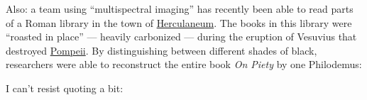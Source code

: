 \documentclass{article}
\def\tightlist{}
\renewcommand{\texttt}[1]{%
  \begingroup
  \ttfamily
  \begingroup\lccode`~=`/\lowercase{\endgroup\def~}{/\discretionary{}{}{}}%
  \begingroup\lccode`~=`[\lowercase{\endgroup\def~}{[\discretionary{}{}{}}%
  \begingroup\lccode`~=`.\lowercase{\endgroup\def~}{.\discretionary{}{}{}}%
  \catcode`/=\active\catcode`[=\active\catcode`.=\active
  \scantokens{#1\noexpand}%
  \endgroup
}
\begin{document}
Also: a team using ``multispectral imaging'' has recently been able to
read parts of a Roman library in the town of
\href{http://en.wikipedia.org/wiki/Herculaneum}{Herculaneum}. The books
in this library were ``roasted in place'' --- heavily carbonized ---
during the eruption of Vesuvius that destroyed
\href{http://en.wikipedia.org/wiki/Pompeii}{Pompeii}. By distinguishing
between different shades of black, researchers were able to reconstruct
the entire book \emph{On Piety} by one Philodemus:


I can't resist quoting a bit:
\end{document}
